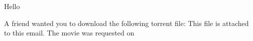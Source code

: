 \documentclass{article}
\begin{document}
Hello %

A friend wanted you to download the following torrent file: %
This file is attached to this email. The movie was requested on %
\end{document}
